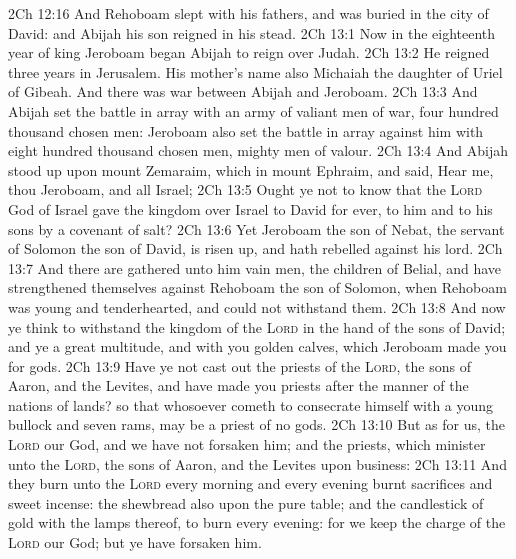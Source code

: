 \vs 2Ch 12:16 And Rehoboam slept with his fathers, and was buried in the city of David: and Abijah his son reigned in his stead.
\vs 2Ch 13:1 Now in the eighteenth year of king Jeroboam began Abijah to reign over Judah.
\vs 2Ch 13:2 He reigned three years in Jerusalem. His mother's name also  Michaiah the daughter of Uriel of Gibeah. And there was war between Abijah and Jeroboam.
\vs 2Ch 13:3 And Abijah set the battle in array with an army of valiant men of war,  four hundred thousand chosen men: Jeroboam also set the battle in array against him with eight hundred thousand chosen men,  mighty men of valour.
\vs 2Ch 13:4 And Abijah stood up upon mount Zemaraim, which  in mount Ephraim, and said, Hear me, thou Jeroboam, and all Israel;
\vs 2Ch 13:5 Ought ye not to know that the \textsc{Lord} God of Israel gave the kingdom over Israel to David for ever,  to him and to his sons by a covenant of salt?
\vs 2Ch 13:6 Yet Jeroboam the son of Nebat, the servant of Solomon the son of David, is risen up, and hath rebelled against his lord.
\vs 2Ch 13:7 And there are gathered unto him vain men, the children of Belial, and have strengthened themselves against Rehoboam the son of Solomon, when Rehoboam was young and tenderhearted, and could not withstand them.
\vs 2Ch 13:8 And now ye think to withstand the kingdom of the \textsc{Lord} in the hand of the sons of David; and ye  a great multitude, and  with you golden calves, which Jeroboam made you for gods.
\vs 2Ch 13:9 Have ye not cast out the priests of the \textsc{Lord}, the sons of Aaron, and the Levites, and have made you priests after the manner of the nations of  lands? so that whosoever cometh to consecrate himself with a young bullock and seven rams,  may be a priest of  no gods.
\vs 2Ch 13:10 But as for us, the \textsc{Lord}  our God, and we have not forsaken him; and the priests, which minister unto the \textsc{Lord},  the sons of Aaron, and the Levites  upon  business:
\vs 2Ch 13:11 And they burn unto the \textsc{Lord} every morning and every evening burnt sacrifices and sweet incense: the shewbread also  upon the pure table; and the candlestick of gold with the lamps thereof, to burn every evening: for we keep the charge of the \textsc{Lord} our God; but ye have forsaken him.
